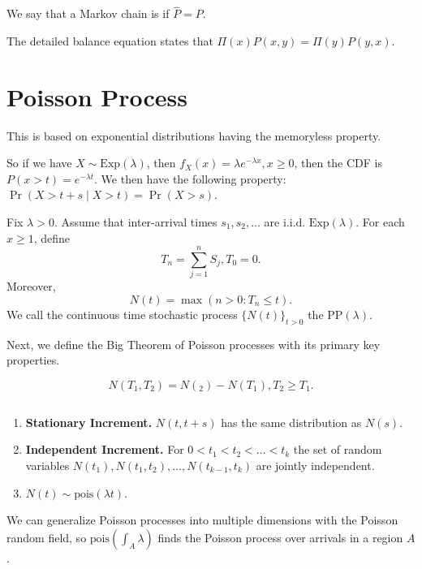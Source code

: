 \documentclass{article}
\newcommand{\pois}{\mathrm{pois}}
\begin{document}
\begin{definition}[Reversibility] 
	We say that a Markov chain is  if $\hat{P} = P$.

	The detailed balance equation states that $\Pi(x) P(x, y) = \Pi(y) P(y, x)$.
\end{definition}

\section{Poisson Process}
This is based on exponential distributions having the memoryless property. 

So if we have $X \sim \mathrm{Exp}(\lambda)$, then $f_X(x) = \lambda e^{-\lambda x}, x \geq 0$, then the CDF is $P(x > t) = e^{-\lambda t}$. 
We then have the following property: $\Pr(X > t + s \mid X > t) = \Pr(X > s)$. 

\begin{definition} 
Fix $\lambda > 0$. Assume that inter-arrival times $s_1, s_2, \ldots$ are i.i.d. $\mathrm{Exp}(\lambda)$. For each $x \geq 1$, define \[T_n = \sum_{j = 1}^n S_j, T_0 = 0.\]
Moreover, \[N(t) = \max(n > 0 : T_n \leq t).\] We call the continuous time stochastic process $\{N(t)\}_{t > 0}$ the  $\mathrm{PP}(\lambda)$.
\end{definition}

Next, we define the Big Theorem of Poisson processes with its primary key properties.
\begin{definition} 
	\[N(T_1, T_2) = N(_2) - N(T_1), T_2 \geq T_1.\]
\end{definition}

\begin{theorem}
	$\qquad$
	\begin{enumerate}
		\item \textbf{Stationary Increment.} $N(t, t + s)$ has the same distribution as $N(s)$.
		\item \textbf{Independent Increment.} For $0 < t_1 < t_2 < \ldots < t_k$ the set of random variables $N(t_1), N(t_1, t_2), \ldots, N(t_{k-1}, t_k)$ are jointly independent.
		\item $N(t) \sim \pois(\lambda t)$.
	\end{enumerate}
\end{theorem}

We can generalize Poisson processes into multiple dimensions with the Poisson random field, so $\pois(\int_{A} \lambda)$ finds the Poisson process over arrivals in a region $A$.
\end{document}
